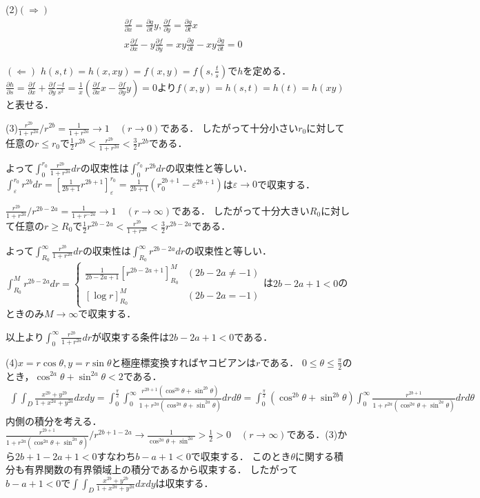 \documentclass[
		book,
		head_space=20mm,
		foot_space=20mm,
		gutter=10mm,
		line_length=190mm
]{jlreq}
\begin{document}
(2)$(\Rightarrow)$
\begin{align}
	&\frac{\partial f}{\partial x}=\frac{\partial g}{\partial t}y,\frac{\partial f}{\partial y}=\frac{\partial g}{\partial t}x\\
	&x\frac{\partial f}{\partial x}-y\frac{\partial f}{\partial y}=xy\frac{\partial g}{\partial t}-xy\frac{\partial g}{\partial t}=0
\end{align}

$(\Leftarrow)$
$h(s,t)=h(x,xy)=f(x,y)=f(s,\frac{t}{s})$で$h$を定める．
$\frac{\partial h}{\partial s}=\frac{\partial f}{\partial x}+\frac{\partial f}{\partial y}\frac{-t}{s^2}=\frac{1}{x}\left( \frac{\partial f}{\partial x}x-\frac{\partial f}{\partial y}y \right)=0$より$f(x,y)=h(s,t)=h(t)=h(xy)$と表せる．

(3)$\frac{r^{2b}}{1+r^{2a}}/r^{2b}=\frac{1}{1+r^{2a}}\rightarrow 1\quad(r\to 0)$である．
したがって十分小さい$r_0$に対して任意の$r\le r_0$で$\frac{1}{2}r^{2b}<\frac{r^{2b}}{1+r^{2a}}<\frac{3}{2}r^{2b}$である．

よって$\int_0^{r_0}\frac{r^{2b}}{1+r^{2a}}dr$の収束性は$\int_{0}^{r_0}r^{2b}dr$の収束性と等しい．
$\int_{\varepsilon}^{r_0} r^{2b}dr=\left[ \frac{1}{2b+1}r^{2b+1} \right]_{\varepsilon}^{r_0}=\frac{1}{2b+1}(r_0^{2b+1}-\varepsilon^{2b+1})$は$\varepsilon\rightarrow 0$で収束する．

$\frac{r^{2b}}{1+r^{2a}}/r^{2b-2a}=\frac{1}{1+r^{-2a}}\rightarrow 1\quad(r\to \infty)$である．
したがって十分大きい$R_0$に対して任意の$r\ge R_0$で$\frac{1}{2}r^{2b-2a}<\frac{r^{2b}}{1+r^{2a}}<\frac{3}{2}r^{2b-2a}$である．

よって$\int_{R_0}^{\infty}\frac{r^{2b}}{1+r^{2a}}dr$の収束性は$\int_{R_0}^{\infty}r^{2b-2a}dr$の収束性と等しい．
$\int_{R_0}^{M} r^{2b-2a}dr=\begin{cases}
	\frac{1}{2b-2a+1}\left[ r^{2b-2a+1} \right]_{R_0}^M&(2b-2a\neq -1)\\
	\left[ \log r \right]_{R_0}^M &(2b-2a=-1)
\end{cases}$は$2b-2a+1<0$のときのみ$M\to\infty$で収束する．

以上より$\int_0^{\infty}\frac{r^{2b}}{1+r^{2a}}dr$が収束する条件は$2b-2a+1<0$である．

(4)$x=r\cos \theta,y=r\sin \theta$と極座標変換すればヤコビアンは$r$である．
$0\le \theta\le \frac{\pi}{2}$のとき，$ \cos^{2a}\theta+\sin^{2a}\theta<2$である．
\begin{align}
	\int\int_D \frac{x^{2b}+y^{2b}}{1+x^{2a}+y^{2a}}dxdy=\int_0^{\frac{\pi}{2}}\int_0^\infty\frac{r^{2b+1}(\cos^{2b}\theta+\sin^{2b}\theta)}{1+r^{2a}(\cos^{2a}\theta+\sin^{2a}\theta)}dr d\theta=\int_0^{\frac{\pi}{2}}(\cos^{2b}\theta+\sin^{2b}\theta)\int_0^\infty\frac{r^{2b+1}}{1+r^{2a}(\cos^{2a}\theta+\sin^{2a}\theta)}dr d\theta
\end{align}
内側の積分を考える．
$\frac{r^{2b+1}}{1+r^{2a}(\cos^{2a}\theta+\sin^{2a}\theta)}/r^{2b+1-2a}\rightarrow \frac{1}{\cos^{2a}\theta+\sin^{2a}}>\frac{1}{2}>0 \quad(r\to \infty)$である．(3)から$2b+1-2a+1<0$すなわち$b-a+1<0$で収束する．
このとき$\theta$に関する積分も有界関数の有界領域上の積分であるから収束する．
したがって$b-a+1<0$で$\int\int_D \frac{x^{2b}+y^{2b}}{1+x^{2a}+y^{2a}}dxdy$は収束する．
\end{document}
